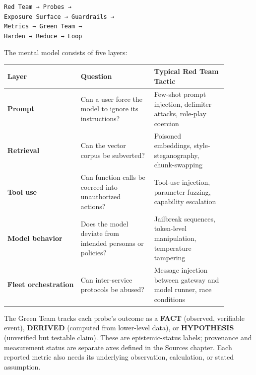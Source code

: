 \label{mental-model}


\begin{Verbatim}[breaklines=true, breakanywhere=true, fontsize=\small]
Red Team → Probes →
Exposure Surface → Guardrails →
Metrics → Green Team →
Harden → Reduce → Loop
\end{Verbatim}

The mental model consists of five layers:

\nopagebreak[4]
\begin{longtable}[]{@{}
  >{\raggedright\arraybackslash}p{0.2927\linewidth}
  >{\raggedright\arraybackslash}p{0.2927\linewidth}
  >{\raggedright\arraybackslash}p{0.2927\linewidth}@{}}
\toprule\noalign{}
\begin{minipage}[b]{\linewidth}\raggedright
Layer
\end{minipage} & \begin{minipage}[b]{\linewidth}\raggedright
Question
\end{minipage} & \begin{minipage}[b]{\linewidth}\raggedright
Typical Red Team Tactic
\end{minipage} \\
\midrule\noalign{}
\endhead
\bottomrule\noalign{}
\endlastfoot
\textbf{Prompt} & Can a user force the model to ignore its instructions?
& Few-shot prompt injection, delimiter attacks, role-play coercion \\
\noalign{\label{tab:24.2}}
\textbf{Retrieval} & Can the vector corpus be subverted? & Poisoned
embeddings, style-steganography, chunk-swapping \\
\textbf{Tool use} & Can function calls be coerced into unauthorized
actions? & Tool-use injection, parameter fuzzing, capability
escalation \\
\textbf{Model behavior} & Does the model deviate from intended personas
or policies? & Jailbreak sequences, token-level manipulation,
temperature tampering \\
\textbf{Fleet orchestration} & Can inter-service protocols be abused? &
Message injection between gateway and model runner, race conditions \\
\end{longtable}

The Green Team tracks each probe's outcome as a \textbf{FACT} (observed,
verifiable event), \textbf{DERIVED} (computed from lower-level data), or
\textbf{HYPOTHESIS} (unverified but testable claim). These are
epistemic-status labels; provenance and measurement status are separate
axes defined in the Sources chapter. Each reported metric also needs its
underlying observation, calculation, or stated assumption.

